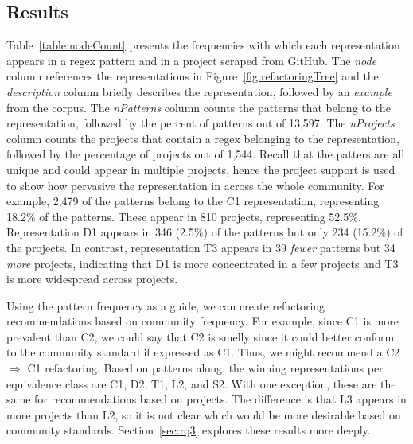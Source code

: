 \subsection{Results}
Table~\ref{table:nodeCount} presents the frequencies with which each representation appears in a regex pattern and in a project scraped from GitHub. The \emph{node} column references the representations in Figure~\ref{fig:refactoringTree} and the \emph{description} column briefly describes the representation, followed by an \emph{example} from the corpus. The \emph{nPatterns} column counts the patterns that belong to the representation, followed by the percent of patterns out of 13,597.
The \emph{nProjects} column counts the projects that contain a regex belonging to the representation,
followed by the percentage of projects out of 1,544.
Recall that the patters are all unique and could appear in multiple projects, hence the project support is used to show how pervasive the representation in across the whole community.
For example, 2,479 of the patterns belong to the C1 representation, representing 18.2\% of the patterns. These appear in 810 projects, representing 52.5\%.
 Representation D1 appears in 346 (2.5\%) of the patterns but only 234 (15.2\%) of the projects. In contrast, representation T3 appears in 39 \emph{fewer} patterns but 34 \emph{more} projects, indicating that D1 is more concentrated in a few projects and T3 is more widespread across projects.

Using the pattern frequency as a guide, we can create refactoring recommendations based on community frequency. For example, since C1 is more prevalent than C2, we could say that C2 is smelly since it could better conform to the community standard if expressed as C1. Thus, we might recommend a C2 $\Rightarrow$ C1 refactoring. Based on patterns along, the winning representations per equivalence class are C1, D2, T1, L2, and S2. With one exception, these are the same for recommendations based on projects. The difference is that L3 appears in more projects than L2, so it is not clear which would be more desirable based on community standards. Section~\ref{sec:rq3} explores these results more deeply.








